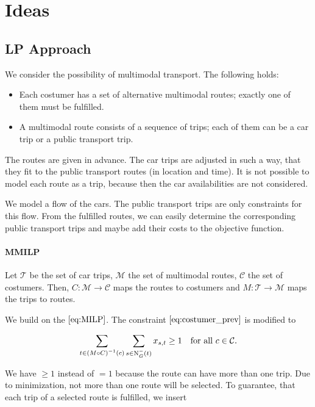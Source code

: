 \section{Ideas}

\subsection{LP Approach}

We consider the possibility of multimodal transport. The following holds:

\begin{itemize}
	\item{Each costumer has a set of alternative multimodal routes; exactly one of them must be fulfilled.}
	\item{A multimodal route consists of a sequence of trips; each of them can be a car trip or a public transport trip.}
\end{itemize}

The routes are given in advance. The car trips are adjusted in such a way, that they fit to the public transport routes (in location and time). It is not possible to model each route as a trip, because then the car availabilities are not considered. 

We model a flow of the cars. The public transport trips are only constraints for this flow. From the fulfilled routes, we can easily determine the corresponding public transport trips and maybe add their costs to the objective function.

\paragraph{MMILP} \parfill

Let $\mathcal{T}$ be the set of car trips, $\mathcal{M}$ the set of multimodal routes, $\mathcal{C}$ the set of costumers. Then, $C:\mathcal{M}\to\mathcal{C}$ maps the routes to costumers and $M:\mathcal{T}\to\mathcal{M}$ maps the trips to routes. 

We build on the $\eqref{eq:MILP}$. The constraint $\eqref{eq:costumer_prev}$ is modified to

\begin{align}
\label{eq:costumer}
	\sum_{t\in\left(M\circ C\right)^{-1}(c)} \sum_{s\in\operatorname{N}_G^-(t)} x_{s,t} \geq 1 & & \text{for all } c\in\mathcal{C}.
\end{align}

We have $\geq 1$ instead of $= 1$ because the route can have more than one trip. Due to minimization, not more than one route will be selected. To guarantee, that each trip of a selected route is fulfilled, we insert

